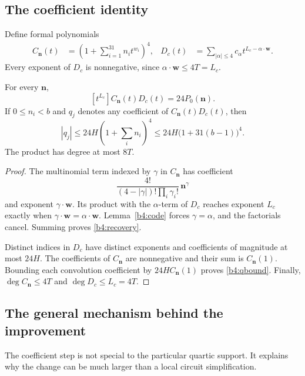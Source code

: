 \subsection{The coefficient identity}
\label{b4:polarization}

Define formal polynomials
\begin{align}
 C_{\mathbf n}(t)&=\left(1+\sum_{i=1}^{31}n_it^{w_i}\right)^4,
 &
 D_c(t)&=\sum_{|\alpha|\le4}c_\alpha t^{L_c-\alpha\cdot\mathbf w}.
 \label{b4:CD}
\end{align}
Every exponent of $D_c$ is nonnegative, since
$\alpha\cdot\mathbf w\le4T=L_c$.

\begin{lemma}
\label{b4:extract}
For every $\mathbf n$,
\[
 [t^{L_c}]C_{\mathbf n}(t)D_c(t)=24P_0(\mathbf n).
 \tag{B4.5}\label{b4:recovery}
\]
If $0\le n_i<b$ and $q_j$ denotes any coefficient of
$C_{\mathbf n}(t)D_c(t)$, then
\[
 |q_j|\le24H\left(1+\sum_i n_i\right)^4
       \le24H\bigl(1+31(b-1)\bigr)^4.
 \tag{B4.6}\label{b4:qbound}
\]
The product has degree at most $8T$.
\end{lemma}

\begin{proof}
The multinomial term indexed by $\gamma$ in $C_{\mathbf n}$ has
coefficient
\[
 \frac{4!}{(4-|\gamma|)!\prod_i\gamma_i!}\,\mathbf n^\gamma
\]
and exponent $\gamma\cdot\mathbf w$.  Its product with the
$\alpha$-term of $D_c$ reaches exponent $L_c$ exactly when
$\gamma\cdot\mathbf w=\alpha\cdot\mathbf w$.  Lemma~\ref{b4:code}
forces $\gamma=\alpha$, and the factorials cancel.  Summing proves
\eqref{b4:recovery}.

Distinct indices in $D_c$ have distinct exponents and coefficients
of magnitude at most $24H$.  The coefficients of $C_{\mathbf n}$
are nonnegative and their sum is $C_{\mathbf n}(1)$.  Bounding each
convolution coefficient by $24H C_{\mathbf n}(1)$ proves
\eqref{b4:qbound}.  Finally,
$\deg C_{\mathbf n}\le4T$ and $\deg D_c\le L_c=4T$.
\end{proof}

\subsection{The general mechanism behind the improvement}
\label{b4:general}

The coefficient step is not special to the particular quartic support.
It explains why the change can be much larger than a local circuit
simplification.

